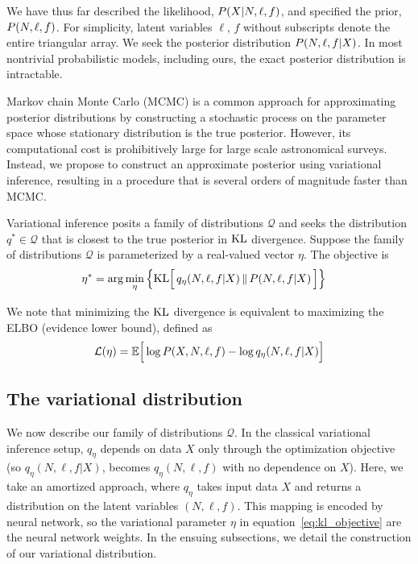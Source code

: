 We have thus far described the likelihood,
$P(X | N, \ell, f)$, and specified the prior, $P(N, \ell, f)$. 
For simplicity, latent variables $\ell$, $f$ without subscripts  
denote the entire triangular array. We seek the posterior distribution 
$P(N, \ell, f | X)$. In most nontrivial probabilistic models, including ours, the exact posterior distribution is intractable.

Markov chain Monte Carlo (MCMC) is a common approach for approximating
posterior distributions by constructing a stochastic process on the parameter space whose stationary distribution is the true posterior. 
However, its computational cost is prohibitively large for
large scale astronomical surveys. Instead, we propose to construct an approximate posterior using variational inference, resulting in a procedure that is several orders of magnitude faster than MCMC.

Variational inference\cite{Blei_2017_vi_review, Jordan_intro_vi, Wainwrite_graph_models_vi}
posits a family of distributions $\mathcal{Q}$ and seeks
the distribution $q^*\in \mathcal{Q}$ that is closest to the true posterior
in $\textrm{KL}$ divergence. Suppose the family of distributions $\mathcal{Q}$ is parameterized by a real-valued vector $\eta$. The objective is 
\begin{align}
   \eta^* &= \arg \min_{\eta} \Big\{ \mathrm{KL}\Big[\,q_\eta(N, \ell, f | X)\, \| \,P(N, \ell, f | X )\,\Big]\Big\} 
   \label{eq:kl_objective}
\end{align}

We note that minimizing the $\textrm{KL}$ divergence is equivalent to maximizing the ELBO (evidence lower bound), defined as 
\begin{align}
    \mathcal{L}(\eta) = \mathbb{E}\Big[\log P(X, N, \ell, f) - \log q_\eta(N, \ell, f | X)\Big]
    \label{eq:elbo}
\end{align}

\subsection{The variational distribution}
We now describe our family of distributions $\mathcal{Q}$. 
In the classical variational inference setup, 
$q_\eta$ depends on data $X$ only through the optimization objective 
(so $q_\eta(N, \ell, f | X)$,
becomes $q_\eta(N, \ell, f)$ with no dependence on $X$). 
Here, we take an amortized approach, where 
$q_\eta$ takes input data $X$ and returns a distribution on the 
latent variables $(N, \ell, f)$. This mapping is encoded by  
neural network, so the variational parameter $\eta$ in equation~\ref{eq:kl_objective} are the neural network weights. 
In the ensuing subsections, we detail the construction of our variational 
distribution. 

